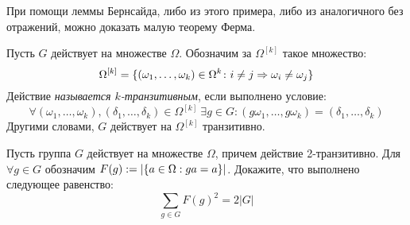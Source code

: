 \begin{corollary}
	При помощи леммы Бернсайда, либо из этого примера, либо из аналогичного без отражений, можно доказать малую теорему Ферма.
\end{corollary}

\begin{definition}
	Пусть $G$ действует на множестве $\Omega$. Обозначим за $\Omega^{[k]}$ такое множество:
	\[
		\Omega^{[k]} = \{(\omega_1, \ldots, \omega_k) \in \Omega^k \colon i \neq j \Rightarrow \omega_i \neq \omega_j\}
	\]
	Действие \textit{называется $k$-транзитивным}, если выполнено условие:
	\[
		\forall (\omega_1, \ldots, \omega_k), (\delta_1, \ldots, \delta_k) \in \Omega^{[k]}\ \exists g \in G \colon (g\omega_1, \ldots, g\omega_k) = (\delta_1, \ldots, \delta_k)
	\]
	Другими словами, $G$ действует на $\Omega^{[k]}$ транзитивно.
\end{definition}

\begin{exercise}
	Пусть группа $G$ действует на множестве $\Omega$, причем действие 2\nobreakdash-транзитивно. Для $\forall g \in G$ обозначим $F(g) := |\{a \hm\in \Omega: ga = a\}|$. Докажите, что выполнено следующее равенство:
	\[\sum\limits_{g \in G}F(g)^2 = 2|G|\]
\end{exercise}